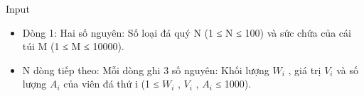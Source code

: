 Input
\begin{itemize}
	\item     Dòng 1: Hai số nguyên: Số loại đá quý N (1 ≤ N ≤ 100) và sức chứa của cái túi M (1 ≤ M ≤ 10000).   
	\item     N dòng tiếp theo: Mỗi dòng ghi 3 số nguyên: Khối lượng $W_{i}$    , giá trị $V_{i}$    và số lượng $A_{i}$    của viên đá thứ i (1 ≤ $W_{i}$    , $V_{i}$    , $A_{i}$    ≤ 1000).   
\end{itemize}